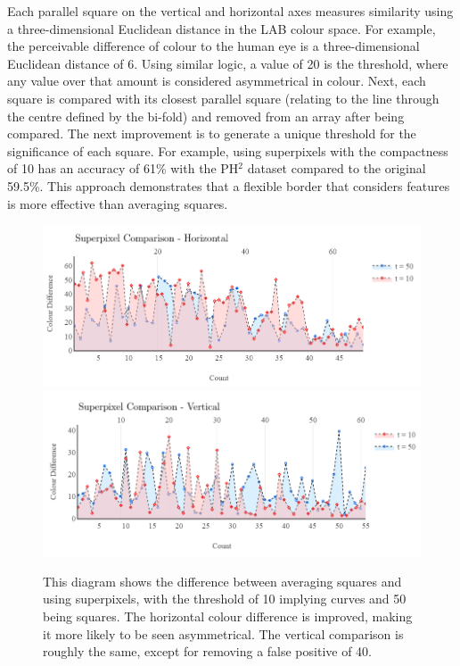 Each parallel square on the vertical and horizontal axes measures similarity using a three-dimensional Euclidean distance in the LAB colour space. For example, the perceivable difference of colour to the human eye is a three-dimensional Euclidean distance of 6\cite{Myridis2014a}. Using similar logic, a value of 20 is the threshold, where any value over that amount is considered asymmetrical in colour. Next, each square is compared with its closest parallel square (relating to the line through the centre defined by the bi-fold) and removed from an array after being compared. The next improvement is to generate a unique threshold for the significance of each square. For example, using superpixels with the compactness of 10 has an accuracy of 61\% with the PH$^2$ dataset compared to the original 59.5\%. This approach demonstrates that a flexible border that considers features is more effective than averaging squares.

\begin{figure}
\centering
\includegraphics[scale=0.7]{images/superpixel2.png}
\includegraphics[scale=0.7]{images/superpixel1.png}
\caption{This diagram shows the difference between averaging squares and using superpixels, with the threshold of 10 implying curves and 50 being squares. The horizontal colour difference is improved, making it more likely to be seen asymmetrical. The vertical comparison is roughly the same, except for removing a false positive of 40.}
\end{figure} \label{asy3}

